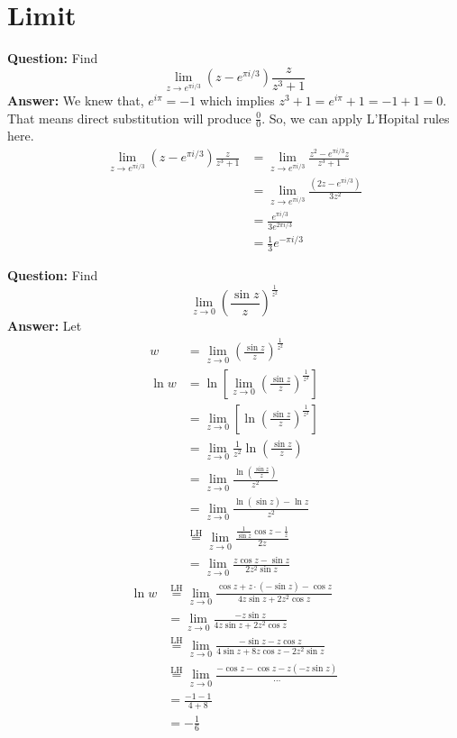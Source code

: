 \chapter{Limit}
\begin{example}
    \textbf{Question:} Find $$\lim_{z\rightarrow e^{\pi i/3}}(z-e^{\pi i/3})\frac{z}{z^3+1}$$
    \textbf{Answer:} We knew that, $e^{i\pi}=-1$ which implies $z^3+1=e^{i\pi}+1=-1+1=0$. That means direct substitution will produce $\frac{0}{0}$. So, we can apply L'Hopital rules here. 
    \begin{align*}
    \lim_{z \to e^{\pi i/3}} (z - e^{\pi i/3}) \frac{z}{z^3 + 1} 
    &= \lim_{z \to e^{\pi i/3}} \frac{z^2 - e^{\pi i/3} z}{z^3 + 1} \\
    &= \lim_{z \to e^{\pi i/3}} \frac{(2z - e^{\pi i/3})}
    {3z^2}\\
    &= \frac{e^{\pi i/3}}{3e^{2\pi i/3}}\\
    &= \frac{1}{3}e^{-\pi i/3}
\end{align*}
\end{example}
\begin{example}
    \textbf{Question:} Find $$\lim_{z\rightarrow0}\left(\frac{\sin z}{z}\right)^{\frac{1}{z^2}}$$
    \textbf{Answer:} Let 
    \begin{align*}
        w&=\lim_{z\rightarrow0}\left(\frac{\sin z}{z}\right)^{\frac{1}{z^2}}\\
        \ln w&= \ln\left[ \lim_{z\rightarrow0}\left(\frac{\sin z}{z}\right)^{\frac{1}{z^2}}\right]\\
        &= \lim_{z\rightarrow0}\left[ \ln\left(\frac{\sin z}{z}\right)^{\frac{1}{z^2}}\right]\\
        &=\lim_{z\rightarrow0} \frac{1}{z^2}\ln\left(\frac{\sin z}{z}\right)\\
        &= \lim_{z\rightarrow0} \frac{\ln\left(\frac{\sin z}{z}\right)}{z^2}\\
        &=\lim_{z\rightarrow0} \frac{\ln(\sin z)-\ln z}{z^2}\\
        &\stackrel{\operatorname{LH}}{=} \lim_{z\rightarrow0} \frac{\frac{1}{\sin z}\cos z-\frac{1}{z}}{2z}\\
        &=\lim_{z\rightarrow0} \frac{z\cos z-\sin z}{2z^2\sin z}
    \end{align*}
    \begin{align*}
       \ln w &\stackrel{\operatorname{LH}}{=} \lim_{z\rightarrow0} \frac{\cos z+z\cdot (-\sin z)-\cos z}{4z\sin z+2z^2\cos z}\\
        &=\lim_{z\rightarrow0} \frac{-z\sin z}{4z\sin z+2z^2\cos z}\\
        &\stackrel{\operatorname{LH}}{=} \lim_{z\rightarrow0} \frac{-\sin z -z\cos z}{4\sin z+8z\cos z-2z^2\sin z}\\
        &\stackrel{\operatorname{LH}}{=}\lim_{z\rightarrow0} \frac{-\cos z-\cos z-z(-z\sin z)}{\cdots}\\
        &= \frac{-1-1}{4+8}\\
        &= -\frac{1}{6}
    \end{align*}
\end{example}
